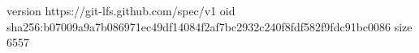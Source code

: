 version https://git-lfs.github.com/spec/v1
oid sha256:b07009a9a7b086971ec49df14084f2af7bc2932c240f8fdf582f9fdc91bc0086
size 6557
